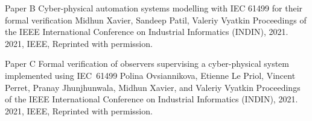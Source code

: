 \documentclass[12pt,a4paper,openright,final,twoside]{cseethesis}
\begin{document}

\makepaperaccepted
  {\paperheader}
  {\papertitle}
  {\paperauthorstring}
  {}
  {\copyrightstring}




\def\paperheader{Paper B}
\def\papertitle{Cyber-physical automation systems modelling with IEC 61499 for their formal verification}
\def\paperauthorstring{Midhun Xavier, Sandeep Patil, Valeriy Vyatkin}
\def\referencestring{Proceedings of the IEEE International Conference on Industrial Informatics (INDIN), 2021.}
\def\copyrightstring{2021, IEEE, Reprinted with permission.}


\makepaperaccepted
  {\paperheader}
  {\papertitle}
  {\paperauthorstring}
  {\referencestring}
  {\copyrightstring}


\def\paperheader{Paper C}
\def\papertitle{Formal verification of observers supervising a cyber-physical system implemented using IEC~61499}
\def\paperauthorstring{Polina Ovsiannikova, Etienne Le Priol, Vincent Perret, Pranay Jhunjhunwala, Midhun Xavier, and Valeriy Vyatkin}
\def\referencestring{Proceedings of the IEEE International Conference on Industrial Informatics (INDIN), 2021.}
\def\copyrightstring{2021, IEEE, Reprinted with permission.}


\makepaperaccepted
  {\paperheader}
  {\papertitle}
  {\paperauthorstring}
  {\referencestring}
  {\copyrightstring}


\end{document}
